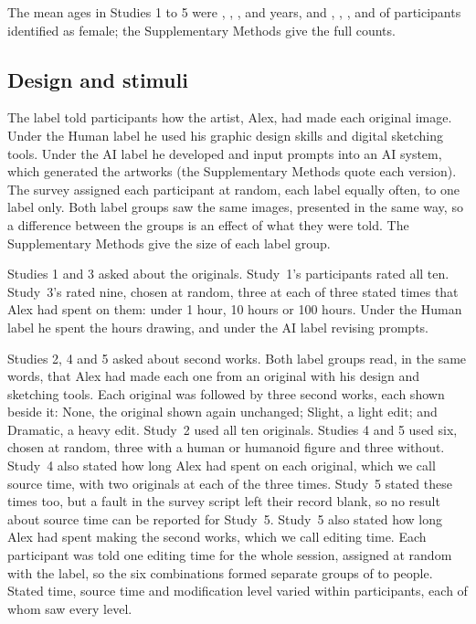 The mean ages in Studies 1 to 5 were \SOneAgeMean, \STwoAgeMean, \SThreeAgeMean, \SFourAgeMean{} and \SFiveAgeMean{} years, and \SOnePctFemale, \STwoPctFemale, \SThreePctFemale, \SFourPctFemale{} and \SFivePctFemale{} of participants identified as female; the Supplementary Methods give the full counts.

\subsection*{Design and stimuli}

The label told participants how the artist, Alex, had made each original image. Under the Human label he used his graphic design skills and digital sketching tools. Under the AI label he developed and input prompts into an AI system, which generated the artworks (the Supplementary Methods quote each version). The survey assigned each participant at random, each label equally often, to one label only. Both label groups saw the same images, presented in the same way, so a difference between the groups is an effect of what they were told. The Supplementary Methods give the size of each label group.

Studies 1 and 3 asked about the originals. Study~1's participants rated all ten. Study~3's rated nine, chosen at random, three at each of three stated times that Alex had spent on them: under 1 hour, 10 hours or 100 hours. Under the Human label he spent the hours drawing, and under the AI label revising prompts.

Studies 2, 4 and 5 asked about second works. Both label groups read, in the same words, that Alex had made each one from an original with his design and sketching tools. Each original was followed by three second works, each shown beside it: None, the original shown again unchanged; Slight, a light edit; and Dramatic, a heavy edit. Study~2 used all ten originals. Studies 4 and 5 used six, chosen at random, three with a human or humanoid figure and three without. Study~4 also stated how long Alex had spent on each original, which we call source time, with two originals at each of the three times. Study~5 stated these times too, but a fault in the survey script left their record blank, so no result about source time can be reported for Study~5. Study~5 also stated how long Alex had spent making the second works, which we call editing time. Each participant was told one editing time for the whole session, assigned at random with the label, so the six combinations formed separate groups of \SFiveNCellMin{} to \SFiveNCellMax{} people. Stated time, source time and modification level varied within participants, each of whom saw every level.

